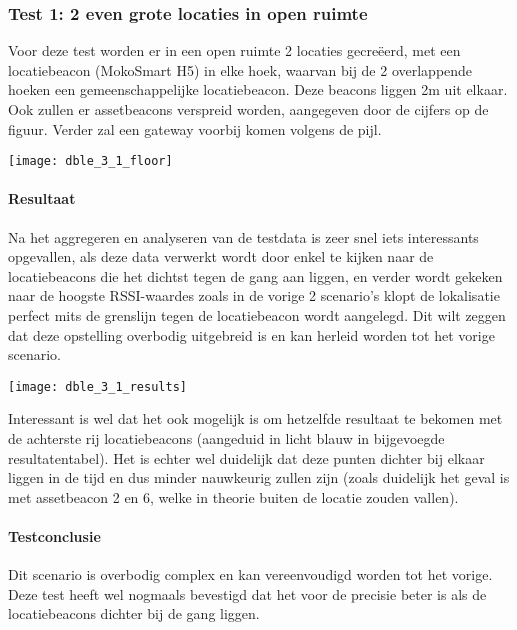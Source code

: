 \subsubsection{Test 1: 2 even grote locaties in open ruimte}
\begin{minipage}{0.55\textwidth}
Voor deze test worden er in een open ruimte 2 locaties gecreëerd, met een locatiebeacon (MokoSmart H5) in elke hoek, waarvan bij de 2 overlappende hoeken een gemeenschappelijke locatiebeacon. Deze beacons liggen 2m uit elkaar. Ook zullen er assetbeacons verspreid worden, aangegeven door de cijfers op de figuur. Verder zal een gateway voorbij komen volgens de pijl. 
\end{minipage}
\hfill
\begin{minipage}{0.42\textwidth}
	\texttt{[image: dble\_3\_1\_floor]}
\end{minipage}

\paragraph{Resultaat}
\begin{minipage}{0.42\textwidth}
Na het aggregeren en analyseren van de testdata is zeer snel iets interessants opgevallen, als deze data verwerkt wordt door enkel te kijken naar de locatiebeacons die het dichtst tegen de gang aan liggen, en verder wordt gekeken naar de hoogste RSSI-waardes zoals in de vorige 2 scenario's klopt de lokalisatie perfect mits de grenslijn tegen de locatiebeacon wordt aangelegd. Dit wilt zeggen dat deze opstelling overbodig uitgebreid is en kan herleid worden tot het vorige scenario. 
\end{minipage}
\hfill
\begin{minipage}{0.55\textwidth}
	\texttt{[image: dble\_3\_1\_results]}
\end{minipage}

Interessant is wel dat het ook mogelijk is om hetzelfde resultaat te bekomen met de achterste rij locatiebeacons (aangeduid in licht blauw in bijgevoegde resultatentabel). Het is echter wel duidelijk dat deze punten dichter bij elkaar liggen in de tijd en dus minder nauwkeurig zullen zijn (zoals duidelijk het geval is met assetbeacon 2 en 6, welke in theorie buiten de locatie zouden vallen).

\paragraph{Testconclusie}
Dit scenario is overbodig complex en kan vereenvoudigd worden tot het vorige. Deze test heeft wel nogmaals bevestigd dat het voor de precisie beter is als de locatiebeacons dichter bij de gang liggen.

